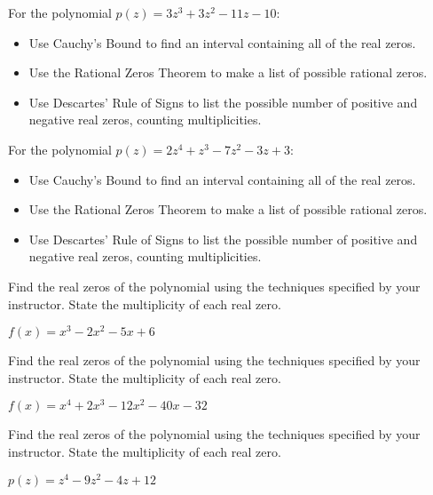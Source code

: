 \documentclass{ximera}
\begin{document}
\begin{problem}
For the polynomial $p(z) = 3z^{3} + 3z^{2} - 11z - 10$:

\begin{itemize}
\item  Use Cauchy's Bound to find an interval containing all of the real zeros.
\item  Use the Rational Zeros Theorem to make a list of possible rational zeros.
\item  Use Descartes' Rule of Signs to list the possible number of positive and negative real zeros, counting multiplicities.
\end{itemize}
\end{problem}

\begin{problem}\label{prelimpolystufflast}
For the polynomial $p(z) = 2z^4+z^3-7z^2-3z+3$:

\begin{itemize}
\item  Use Cauchy's Bound to find an interval containing all of the real zeros.
\item  Use the Rational Zeros Theorem to make a list of possible rational zeros.
\item  Use Descartes' Rule of Signs to list the possible number of positive and negative real zeros, counting multiplicities.
\end{itemize}
\end{problem}

\begin{problem}\label{findrealzerosexerfirst}
Find the real zeros of the polynomial using the techniques specified by your instructor.  State the multiplicity of each real zero.

$f(x) = x^{3} - 2x^{2} - 5x + 6$
\end{problem}

\begin{problem}
Find the real zeros of the polynomial using the techniques specified by your instructor.  State the multiplicity of each real zero.

$f(x) = x^{4} + 2x^{3} - 12x^{2} - 40x - 32$
\end{problem}

\begin{problem}
Find the real zeros of the polynomial using the techniques specified by your instructor.  State the multiplicity of each real zero.

$p(z) = z^{4} - 9z^{2} - 4z + 12$
\end{problem}
\end{document}
